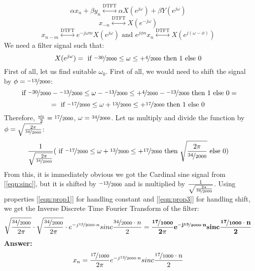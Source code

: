 \documentclass{article}
\begin{document}
\begin{equation}
\label{eqn:prop1}
    \alpha x_n + \beta y_n \stackrel{\mathrm{DTFT}}{\longleftrightarrow} \alpha X(e^{j\omega}) + \beta Y(e^{j \omega})
\end{equation}
\begin{equation}
\label{eqn:prop2}
    x_{-n} \stackrel{\mathrm{DTFT}}{\longleftrightarrow} X(e^{-j\omega})
\end{equation}
\begin{equation}
\label{eqn:prop3}
    x_{n-m} \stackrel{\mathrm{DTFT}}{\longleftrightarrow} e^{-j\omega m} X(e^{j\omega}) \text{ and } e^{j \phi n} x_{n} \stackrel{\mathrm{DTFT}}{\longleftrightarrow} X(e^{j(\omega - \phi)}) 
\end{equation}
We need a filter signal such that:
$$
X(e^{j \omega}) = \text{ if } \nicefrac{-30}{2000} \le \omega \le +\nicefrac{4}{2000} \text{ then } 1 \text{ else } 0 
$$
First of all, let us find suitable $\omega_0$. First of all, we would need to shift the signal by $\phi = \nicefrac{-13}{2000}$:
$$
\text{ if } \nicefrac{-30}{2000} - \nicefrac{-13}{2000} \le \omega - \nicefrac{-13}{2000} \le +\nicefrac{4}{2000} - \nicefrac{-13}{2000} \text{ then } 1 \text{ else } 0 = 
$$
$$
= \text{ if } \nicefrac{-17}{2000} \le \omega + \nicefrac{13}{2000} \le +\nicefrac{17}{2000} \text{ then } 1 \text{ else } 0 
$$
Therefore, $\frac{\omega_0}{2} = \nicefrac{17}{2000}$, $\omega = \nicefrac{34}{2000}$. Let us multiply and divide the function by $\phi = \sqrt{\frac{2\pi}{\nicefrac{34}{2000}}}$:
$$\frac{1}{\sqrt{\frac{2\pi}{\nicefrac{34}{2000}}}}(\text{ if } \nicefrac{-17}{2000} \le \omega + \nicefrac{13}{2000} \le +\nicefrac{17}{2000} \text{ then } \sqrt{\frac{2\pi}{\nicefrac{34}{2000}}} \text{ else } 0)$$
From this, it is immediately obvious we got the Cardinal sine signal from [\ref{eqn:sinc}], but it is shifted by $\nicefrac{-13}{2000}$ and is multiplied by $\frac{1}{\sqrt{\frac{2\pi}{\nicefrac{34}{2000}}}}$. Using properties [\ref{eqn:prop1}] for handling constant and [\ref{eqn:prop3}] for handling shift, we get the Inverse Discrete Time Fourier Transform of the filter:
$$\sqrt{\frac{\nicefrac{34}{2000}}{2\pi}} \cdot \sqrt{\frac{\nicefrac{34}{2000}}{2\pi}} \cdot e^{-j\nicefrac{13}{2000} \cdot n} sinc \frac{\nicefrac{34}{2000} \cdot n}{2} = \mathbf{ \frac{\nicefrac{\mathbf{17}}{1000}}{2\pi} e^{-j\nicefrac{\mathbf{13}}{2000} \cdot n} sinc \frac{\nicefrac{\mathbf{17}}{1000} \cdot n}{2}}$$
\textbf{Answer:}
$$
x_n =  \frac{\nicefrac{17}{1000}}{2\pi} e^{-j\nicefrac{13}{2000} \cdot n} sinc \frac{\nicefrac{17}{1000} \cdot n}{2}
$$
\end{document}
